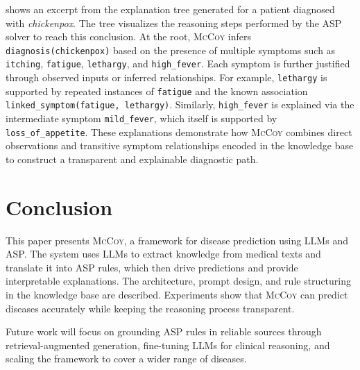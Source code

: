 \documentclass[11pt,leqno]{amsart}
\newcommand{\sys}{\textsc{McCoy}\xspace}
\begin{document}
 shows an excerpt from the explanation 
tree generated for a patient diagnosed with \textit{chickenpox}. 
The tree visualizes the reasoning steps performed by the ASP solver to reach this conclusion. 
At the root, \sys infers \texttt{diagnosis(chickenpox)} 
based on the presence of multiple symptoms such as \texttt{itching}, \texttt{fatigue}, \texttt{lethargy}, 
and \texttt{high\_fever}. 
Each symptom is further justified through observed inputs or inferred relationships. 
For example, \texttt{lethargy} is supported by repeated instances of \texttt{fatigue} 
and the known association \texttt{linked\_symptom(fatigue, lethargy)}. 
Similarly, \texttt{high\_fever} is explained via the intermediate symptom \texttt{mild\_fever}, 
which itself is supported by \texttt{loss\_of\_appetite}. 
These explanations demonstrate how \sys combines direct observations 
and transitive symptom relationships encoded in the knowledge base to 
construct a transparent and explainable diagnostic path.

\section{Conclusion}\label{sec:conclusion}

This paper presents \sys, a framework for disease prediction using LLMs and ASP. 
The system uses LLMs to extract knowledge from medical texts and translate it into ASP rules, 
which then drive predictions and provide interpretable explanations. 
The architecture, prompt design, and rule structuring in the knowledge base are described.
Experiments show that \sys can predict diseases accurately 
while keeping the reasoning process transparent.

Future work will focus on grounding ASP rules in reliable sources 
through retrieval-augmented generation, fine-tuning LLMs for clinical reasoning, 
and scaling the framework to cover a wider range of diseases.


\end{document}
